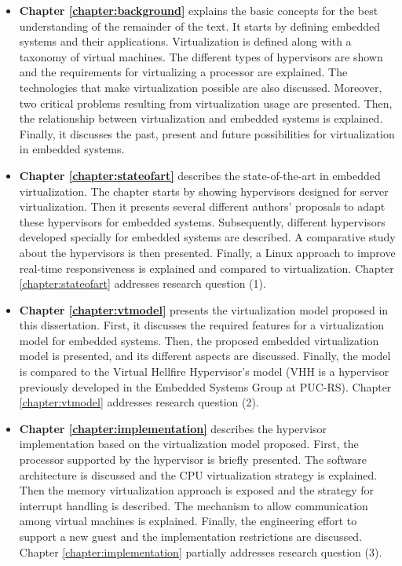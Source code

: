 \begin{itemize}
\item \textbf{Chapter \ref{chapter:background}} explains the basic concepts for the best understanding of the remainder of the text. It starts by defining embedded systems and their applications. Virtualization is defined along with a taxonomy of virtual machines. The different types of hypervisors are shown and the requirements for virtualizing a processor are explained. The technologies that make virtualization possible are also discussed. Moreover, two critical problems resulting from virtualization usage are presented.  Then, the relationship between virtualization and embedded systems is explained. Finally, it discusses the past, present and future possibilities for virtualization in embedded systems. 

\item \textbf{Chapter \ref{chapter:stateofart}} describes the state-of-the-art in embedded virtualization. The chapter starts by showing hypervisors designed for server virtualization. Then it presents several different authors’ proposals to adapt these hypervisors for embedded systems. Subsequently, different hypervisors developed specially for embedded systems are described.  A comparative study about the hypervisors is then presented. Finally, a Linux approach to improve real-time responsiveness is explained and compared to virtualization. Chapter \ref{chapter:stateofart} addresses research question (1).

\item \textbf{Chapter \ref{chapter:vtmodel}} presents the virtualization model proposed in this dissertation. First, it discusses the required features for a virtualization model for embedded systems. Then, the proposed embedded virtualization model is presented, and its different aspects are discussed. Finally, the model is compared to the Virtual Hellfire Hypervisor's model (VHH is a hypervisor previously developed in the Embedded Systems Group at PUC-RS). Chapter \ref{chapter:vtmodel} addresses research question (2).

\item \textbf{Chapter \ref{chapter:implementation}} describes the hypervisor implementation based on the virtualization model proposed. First, the processor supported by the hypervisor is briefly presented. The software architecture is discussed and the CPU virtualization strategy is explained.  Then the memory virtualization approach is exposed and the strategy for interrupt handling is described. The mechanism to allow communication among virtual machines is explained. Finally, the engineering effort to support a new guest and the implementation restrictions are discussed. Chapter \ref{chapter:implementation} partially addresses research question (3).


\end{itemize}
